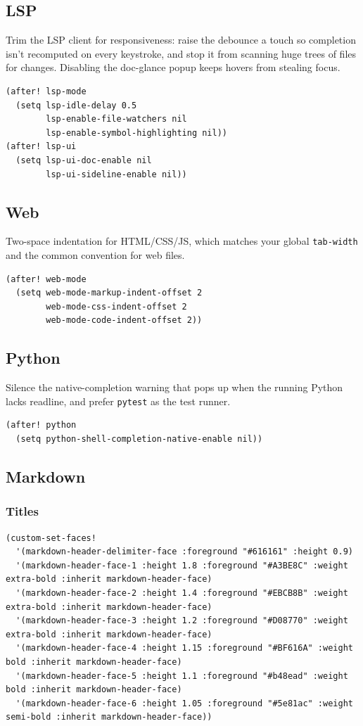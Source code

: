 \documentclass[11pt]{article}
\begin{document}
\subsection{LSP}
\label{sec:org9f35834}
Trim the LSP client for responsiveness: raise the debounce a touch so
completion isn't recomputed on every keystroke, and stop it from
scanning huge trees of files for changes. Disabling the doc-glance
popup keeps hovers from stealing focus.

\begin{verbatim}
(after! lsp-mode
  (setq lsp-idle-delay 0.5
        lsp-enable-file-watchers nil
        lsp-enable-symbol-highlighting nil))
(after! lsp-ui
  (setq lsp-ui-doc-enable nil
        lsp-ui-sideline-enable nil))
\end{verbatim}
\subsection{Web}
\label{sec:orga27a8cb}
Two-space indentation for HTML/CSS/JS, which matches your global
\texttt{tab-width} and the common convention for web files.

\begin{verbatim}
(after! web-mode
  (setq web-mode-markup-indent-offset 2
        web-mode-css-indent-offset 2
        web-mode-code-indent-offset 2))
\end{verbatim}
\subsection{Python}
\label{sec:org16e4114}
Silence the native-completion warning that pops up when the running
Python lacks readline, and prefer \texttt{pytest} as the test runner.

\begin{verbatim}
(after! python
  (setq python-shell-completion-native-enable nil))
\end{verbatim}
\subsection{Markdown}
\label{sec:org39a8418}
\subsubsection{Titles}
\label{sec:org4008825}
\begin{verbatim}
(custom-set-faces!
  '(markdown-header-delimiter-face :foreground "#616161" :height 0.9)
  '(markdown-header-face-1 :height 1.8 :foreground "#A3BE8C" :weight extra-bold :inherit markdown-header-face)
  '(markdown-header-face-2 :height 1.4 :foreground "#EBCB8B" :weight extra-bold :inherit markdown-header-face)
  '(markdown-header-face-3 :height 1.2 :foreground "#D08770" :weight extra-bold :inherit markdown-header-face)
  '(markdown-header-face-4 :height 1.15 :foreground "#BF616A" :weight bold :inherit markdown-header-face)
  '(markdown-header-face-5 :height 1.1 :foreground "#b48ead" :weight bold :inherit markdown-header-face)
  '(markdown-header-face-6 :height 1.05 :foreground "#5e81ac" :weight semi-bold :inherit markdown-header-face))
\end{verbatim}
\end{document}
